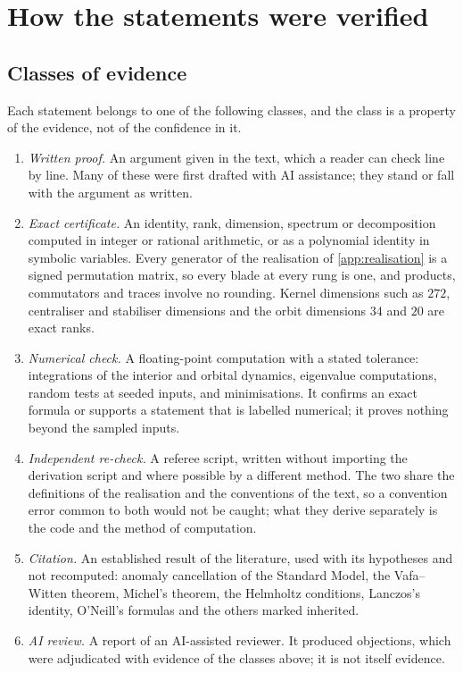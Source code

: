 \section{How the statements were verified}
\label{app:methods}
\label{s9:sec:methods}
\label{r9:sec:main}

\subsection{Classes of evidence}

Each statement belongs to one of the following classes, and the class is a property of the evidence, not of the confidence in it.
\begin{enumerate}[label=(\roman*),leftmargin=2.2em]
\item \emph{Written proof.} An argument given in the text, which a reader can check line by line. Many of these were first drafted with AI
assistance; they stand or fall with the argument as written.
\item \emph{Exact certificate.} An identity, rank, dimension, spectrum or decomposition computed in integer or rational arithmetic, or as a
polynomial identity in symbolic variables. Every generator of the realisation of \cref{app:realisation} is a signed permutation matrix, so
every blade at every rung is one, and products, commutators and traces involve no rounding. Kernel dimensions such as $272$, centraliser and
stabiliser dimensions and the orbit dimensions $34$ and $20$ are exact ranks.
\item \emph{Numerical check.} A floating-point computation with a stated tolerance: integrations of the interior and orbital dynamics,
eigenvalue computations, random tests at seeded inputs, and minimisations. It confirms an exact formula or supports a statement that is
labelled numerical; it proves nothing beyond the sampled inputs.
\item \emph{Independent re-check.} A referee script, written without importing the derivation script and where possible by a different
method. The two share the definitions of the realisation and the conventions of the text, so a convention error common to both would not be
caught; what they derive separately is the code and the method of computation.
\item \emph{Citation.} An established result of the literature, used with its hypotheses and not recomputed: anomaly cancellation of the
Standard Model, the Vafa--Witten theorem, Michel's theorem, the Helmholtz conditions, Lanczos's identity, O'Neill's formulas and the others
marked inherited.
\item \emph{AI review.} A report of an AI-assisted reviewer. It produced objections, which were adjudicated with evidence of the classes
above; it is not itself evidence.
\end{enumerate}


